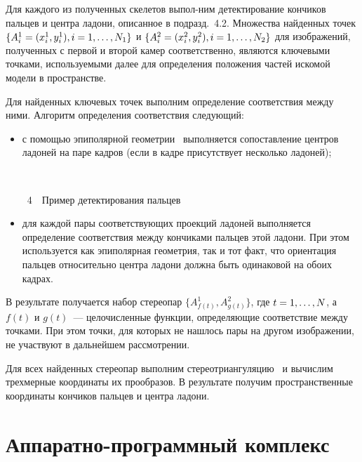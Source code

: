 \begin{multicols}{2}
Для каждого из полученных скелетов выпол-\linebreak ним детектирование кончиков пальцев 
и центра ла\-дони, описанное в подразд.~4.2. 
Множества найден\-ных точек $\{A^1_i\hm=(x^1_i, y^1_i), i=1, \ldots , N_1\}$ и 
$\{A^2_i\hm=(x^2_i, y^2_i), i=1, \ldots , N_2\}$ для изображений,
полученных с первой и второй камер соответственно, являются ключевыми точками, 
используемыми далее для определения положения частей искомой модели в пространстве.


Для найденных ключевых точек выполним определение соответствия между ними. 
Алгоритм определения соответствия следующий:
\begin{itemize}
\item с помощью эпиполярной геометрии~\cite{MultiViewGeometry2004} выполняется 
сопоставление центров ладоней на паре кадров (если в кадре присутствует несколько ладоней);
\begin{center} %
\vspace*{1pt}
\mbox{%
 \epsfxsize=70.232mm
}
\end{center}
\begin{center}
{{\figurename~4}\ \ \small{Пример детектирования пальцев}}
\end{center}
\vspace*{3pt}


\item для каждой пары соответствующих проекций ладоней выполняется определение соответствия 
между кончиками пальцев этой ладони. При этом используется как эпиполярная геометрия, так и 
тот факт, что ориентация пальцев относительно центра ладони должна быть одинаковой на обоих 
кадрах.
\end{itemize}



В результате получается набор стереопар $\{A^1_{f(t)}, A^2_{g(t)}\}$, 
где $t \hm= 1, \ldots , N$, а $f(t)$ и $g(t)$~--- целочисленные функции, 
определяющие соответствие между точками.
При этом точки, для которых не нашлось пары на другом изображении, 
не участвуют в дальнейшем рассмотрении.

Для всех найденных стереопар выполним стереотриангуляцию~\cite{MultiViewGeometry2004} 
и вычислим трехмерные координаты их прообразов.
В результате получим пространственные координаты кончиков пальцев и центра ладони.

\section{Аппаратно-программный комплекс}\label{sec:Experiments}


\end{multicols}
